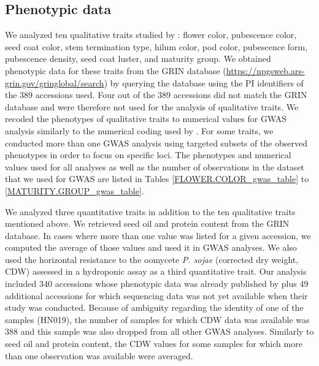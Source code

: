 \subsection{Phenotypic data}
\label{sv-gwas-phenotypic-data}

We analyzed ten qualitative traits studied by \cite{bandillo2017}: flower
color, pubescence color, seed coat color, stem termination type, hilum color,
pod color, pubescence form, pubescence density, seed coat luster, and maturity
group.  We obtained phenotypic data for these traits from the GRIN database
(\url{https://npgsweb.ars-grin.gov/gringlobal/search}) by querying the database
using the PI identifiers of the 389 accessions used.  Four out of the 389
accessions did not match the GRIN database and were therefore not used for the
analysis of qualitative traits. We recoded the phenotypes of qualitative traits
to numerical values for GWAS analysis similarly to the numerical coding used by
\cite{bandillo2017}.  For some traits, we conducted more than one GWAS analysis
using targeted subsets of the observed phenotypes in order to focus on specific
loci. The phenotypes and numerical values used for all analyses as well as the
number of observations in the dataset that we used for GWAS are listed in
Tables \ref{FLOWER.COLOR_gwas_table} to \ref{MATURITY.GROUP_gwas_table}.

We analyzed three quantitative traits in addition to the ten qualitative traits
mentioned above.  We retrieved seed oil and protein content from the GRIN
database. In cases where more than one value was listed for a given accession,
we computed the average of those values and used it in GWAS analyses. We also
used the horizontal resistance to the oomycete \emph{P. sojae} (corrected dry
weight, CDW) assessed in a hydroponic assay \citep{deronne2022} as a third
quantitative trait. Our analysis included 340 accessions whose phenotypic data
was already published by \cite{deronne2022} plus 49 additional accessions for
which sequencing data was not yet available when their study was conducted.
Because of ambiguity regarding the identity of one of the samples (HN019), the
number of samples for which CDW data was available was 388 and this sample
was also dropped from all other GWAS analyses. Similarly to seed oil and
protein content, the CDW values for some samples for which more than one
observation was available were averaged.

